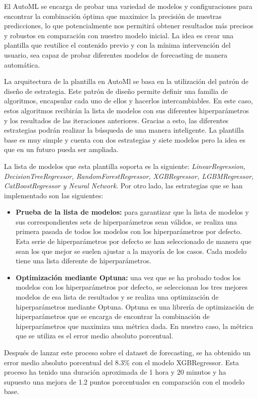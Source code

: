 El AutoML se encarga de probar una variedad de modelos y configuraciones 
para encontrar la combinación óptima que maximice la precisión de nuestras 
predicciones, lo que potencialmente nos permitirá obtener resultados más precisos 
y robustos en comparación con nuestro modelo inicial. La idea es crear una plantilla
que reutilice el contenido previo y con la mínima intervención del usuario, sea capaz
de probar diferentes modelos de forecasting de manera automática.\medskip

La arquitectura de la plantilla en AutoMl se basa en la utilización del patrón
de diseño de estrategia. Este patrón de diseño permite definir una familia de algoritmos,
encapsular cada uno de ellos y hacerlos intercambiables. En este caso, estos algoritmos
recibirán la lista de modelos con sus diferentes hiperparámetros y los resultados de las
iteraciones anteriores. Gracias a esto, las diferentes estrategias podrán realizar la
búsqueda de una manera inteligente. La plantilla base es muy simple y cuenta con dos estrategias 
y siete modelos pero la idea es que en un futuro pueda ser ampliada.\medskip

La lista de modelos que esta plantilla soporta es la siguiente: \textit{LinearRegression, 
DecisionTreeRegressor, RandomForestRegressor, XGBRegressor, LGBMRegressor, CatBoostRegressor
y Neural Network}. Por otro lado, las estrategias que se han implementado son las siguientes:

\begin{itemize}
    \item \textbf{Prueba de la lista de modelos:} para garantizar que la lista
    de modelos y sus correspondientes sets de hiperparámetros sean válidos, se
    realiza una primera pasada de todos los modelos con los hiperparámetros por defecto.
    Esta serie de hiperparámetros por defecto se han seleccionado de manera que sean
    los que mejor se suelen ajustar a la mayoría de los casos. Cada modelo tiene una
    lista diferente de hiperparámetros.
    \item \textbf{Optimización mediante Optuna:} una vez que se ha probado todos los modelos
    con los hiperparámetros por defecto, se seleccionan los tres mejores modelos de esa lista
    de resultados y se realiza una optimización de hiperparámetros mediante Optuna. Optuna
    es una librería de optimización de hiperparámetros que se encarga de encontrar la combinación
    de hiperparámetros que maximiza una métrica dada. En nuestro caso, la métrica que se
    utiliza es el error medio absoluto porcentual.
\end{itemize}

Después de lanzar este proceso sobre el dataset de forecasting, se ha obtenido
un error medio absoluto porcentual del 8.3\% con el modelo XGBRegressor. Esta proceso
ha tenido una duración aproximada de 1 hora y 20 minutos y ha supuesto una mejora de
1.2 puntos porcentuales en comparación con el modelo base. 